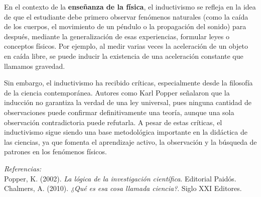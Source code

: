 \documentclass{article}
\begin{document}
En el contexto de la \textbf{enseñanza de la física}, el inductivismo se refleja en la idea de que el estudiante debe primero observar fenómenos naturales (como la caída de los cuerpos, el movimiento de un péndulo o la propagación del sonido) para después, mediante la generalización de esas experiencias, formular leyes o conceptos físicos. Por ejemplo, al medir varias veces la aceleración de un objeto en caída libre, se puede inducir la existencia de una aceleración constante que llamamos gravedad.

Sin embargo, el inductivismo ha recibido críticas, especialmente desde la filosofía de la ciencia contemporánea. Autores como Karl Popper señalaron que la inducción no garantiza la verdad de una ley universal, pues ninguna cantidad de observaciones puede confirmar definitivamente una teoría, aunque una sola observación contradictoria puede refutarla. A pesar de estas críticas, el inductivismo sigue siendo una base metodológica importante en la didáctica de las ciencias, ya que fomenta el aprendizaje activo, la observación y la búsqueda de patrones en los fenómenos físicos. 

\begin{flushright}
	\textit{Referencias:} \\
	Popper, K. (2002). \textit{La lógica de la investigación científica}. Editorial Paidós. \\
	Chalmers, A. (2010). \textit{¿Qué es esa cosa llamada ciencia?}. Siglo XXI Editores.
\end{flushright}
\end{document}
